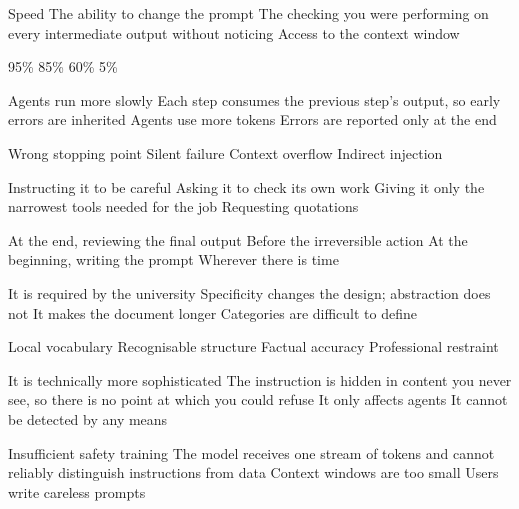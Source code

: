 \documentclass[11pt,a4paper]{article}
\begin{document}

\begin{questions}

  {Speed}
  {The ability to change the prompt}
  {The checking you were performing on every intermediate output without noticing}
  {Access to the context window}

  {95\%}
  {85\%}
  {60\%}
  {5\%}

  {Agents run more slowly}
  {Each step consumes the previous step's output, so early errors are inherited}
  {Agents use more tokens}
  {Errors are reported only at the end}

  {Wrong stopping point}
  {Silent failure}
  {Context overflow}
  {Indirect injection}

  {Instructing it to be careful}
  {Asking it to check its own work}
  {Giving it only the narrowest tools needed for the job}
  {Requesting quotations}

  {At the end, reviewing the final output}
  {Before the irreversible action}
  {At the beginning, writing the prompt}
  {Wherever there is time}

  {It is required by the university}
  {Specificity changes the design; abstraction does not}
  {It makes the document longer}
  {Categories are difficult to define}

  {Local vocabulary}
  {Recognisable structure}
  {Factual accuracy}
  {Professional restraint}

  {It is technically more sophisticated}
  {The instruction is hidden in content you never see, so there is no point at which you could refuse}
  {It only affects agents}
  {It cannot be detected by any means}

  {Insufficient safety training}
  {The model receives one stream of tokens and cannot reliably distinguish instructions from data}
  {Context windows are too small}
  {Users write careless prompts}

\end{questions}
\end{document}

